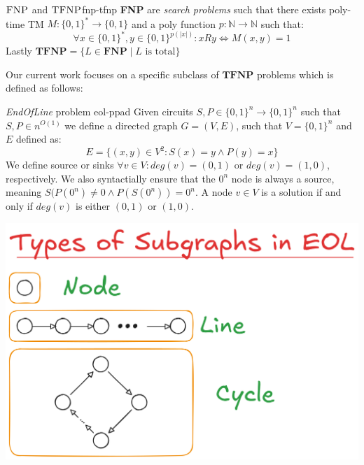 \begin{definitionbox}{$\textnormal{\textsc{FNP}}$ and $\textnormal{\textsc{TFNP}}$}{fnp-tfnp}
    \textbf{FNP} are \textit{search problems} such that there exists poly-time TM $M: \{0,1\}^* \to \{0,1\}$
    and a poly function $p : \mathbb{N} \to \mathbb{N}$ such that:
    $$
    \forall x \in \{0,1\}^*, y \in \{0,1\}^{p(|x|)}: xRy \iff M(x,y) = 1
    $$
    Lastly $\textbf{TFNP} = \{L \in \textbf{FNP} \mid L \text{ is total}\}$
\end{definitionbox}

%


Our current work focuses on a specific subclass of $\textbf{TFNP}$ problems
which is defined as follows:

\begin{minipage}{0.55\linewidth}
\begin{definitionbox}{\textit{EndOfLine} problem \cite{papadimitriou_ComplexityParityArgument_1994}}{eol-ppad}
    Given circuits $S, P \in \{0,1\}^n \to \{0,1\}^n$ such that $S,P \in n^{O(1)}$
    we define a directed graph $G = (V,E)$, such that $V= \{0,1\}^n$ and $E$ defined as:
    $$
    E = \{(x,y) \in V^2: S(x) = y \wedge P(y) = x\}
    $$
    We define source or sinks $\forall v \in V: \textit{deg}(v) = (0,1)$ or
    $\textit{deg}(v) = (1,0)$, respectively. 
    We also syntactially ensure that the $0^n$ node is always a source, meaning
    $S(P(0^n) \neq 0 \wedge P(S(0^n)) = 0^n$.
    A node $v \in V$ is a solution if and only if $\textit{deg}(v)$ is either
    $(0,1)$  or $(1,0)$.
\end{definitionbox}
\end{minipage}
\begin{minipage}{0.45\linewidth}
    \centering
    \includegraphics[width=0.7\linewidth]{assets/eol-subgraphs.png}
    \label{fig:eol-subgraphs}
\end{minipage}

